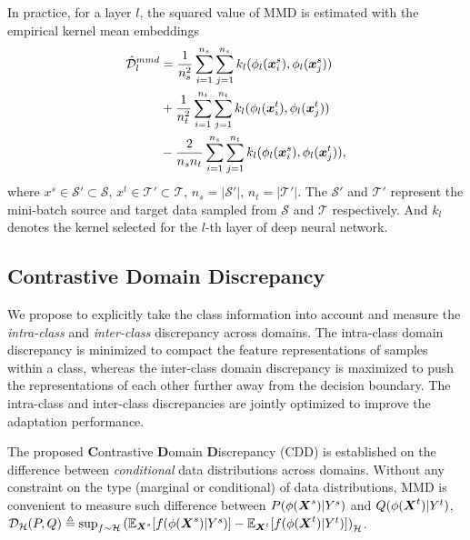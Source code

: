 \documentclass[10pt,twocolumn,letterpaper]{article}
\begin{document}
In practice, for a layer $l$, the squared value of MMD is estimated with the empirical kernel mean embeddings 
\begin{align}
\hat{\mathcal{D}}^{mmd}_l &= \frac{1}{n_{s}^2}\sum_{i=1}^{n_{s}}\sum_{j=1}^{n_{s}}{k_{l}(\phi_l(\boldsymbol{x}^{s}_i), \phi_l(\boldsymbol{x}^{s}_j))} \nonumber \\
					      &+ \frac{1}{n_{t}^2}\sum_{i=1}^{n_{t}}\sum_{j=1}^{n_{t}}{k_{l}(\phi_l(\boldsymbol{x}^{t}_i), \phi_l(\boldsymbol{x}^{t}_j))} \nonumber \\
					      &- \frac{2}{n_{s}n_{t}}\sum_{i=1}^{n_{s}}\sum_{j=1}^{n_{t}}{k_{l}(\phi_l(\boldsymbol{x}^{s}_i), \phi_l(\boldsymbol{x}^{t}_j))},
\end{align}
where $x^s\in \mathcal{S}' \subset \mathcal{S}$, $x^t\in \mathcal{T}' \subset \mathcal{T}$, 
$n_s =\lvert\mathcal{S}'\rvert$, $n_t =\lvert\mathcal{T}'\rvert$. 
The $\mathcal{S}'$ and $\mathcal{T}'$ represent the mini-batch source and target data sampled from 
$\mathcal{S}$ and $\mathcal{T}$ respectively.
And $k_{l}$ denotes the kernel selected for the $l$-th layer of deep neural network.




\subsection{Contrastive Domain Discrepancy}\label{sec:cdd}


We propose to explicitly take the class information into account and measure the \emph{intra-class} and \emph{inter-class} discrepancy across domains.
The intra-class domain discrepancy is minimized to compact the feature representations of  samples within a class,
whereas the inter-class domain discrepancy is maximized to push the representations of each other further away from the decision boundary. The intra-class and inter-class discrepancies are jointly optimized to improve the adaptation performance.


The proposed \textbf{C}ontrastive \textbf{D}omain \textbf{D}iscrepancy (CDD) is established on 
the difference between 
\textit{conditional} data distributions across domains.
Without any constraint on the type (\eg marginal or conditional) of data distributions, 
MMD is convenient to measure such difference between $P(\phi(\boldsymbol{X}^{s})|Y^s)$ and $Q(\phi(\boldsymbol{X}^{t})|Y^t)$, \ie 
$\mathcal{D}_{\mathcal{H}}(P, Q) \triangleq \sup_{f\sim \mathcal{H}}
{(\mathbb{E}_{\boldsymbol{X}^s}[f(\phi(\boldsymbol{X}^s)|Y^s)] - \mathbb{E}_{\boldsymbol{X}^t}[f(\phi(\boldsymbol{X}^t)|Y^t)])}_\mathcal{H}$.
\end{document}
